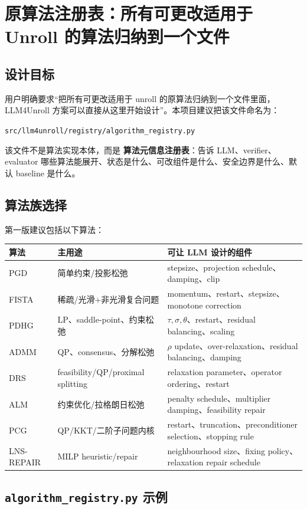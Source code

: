 \documentclass[12pt,a4paper]{ctexart}
\begin{document}
\section{原算法注册表：所有可更改适用于 Unroll 的算法归纳到一个文件}

\subsection{设计目标}
用户明确要求“把所有可更改适用于 unroll 的原算法归纳到一个文件里面，LLM4Unroll 方案可以直接从这里开始设计”。本项目建议把该文件命名为：
\begin{center}
\texttt{src/llm4unroll/registry/algorithm\_registry.py}
\end{center}

该文件不是算法实现本体，而是 \textbf{算法元信息注册表}：告诉 LLM、verifier、evaluator 哪些算法能展开、状态是什么、可改组件是什么、安全边界是什么、默认 baseline 是什么。

\subsection{算法族选择}
第一版建议包括以下算法：
\begin{longtable}{p{}p{}p{}}
\toprule
算法 & 主用途 & 可让 LLM 设计的组件 \\
\midrule
PGD & 简单约束/投影松弛 & stepsize、projection schedule、damping、clip \\
FISTA & 稀疏/光滑+非光滑复合问题 & momentum、restart、stepsize、monotone correction \\
PDHG & LP、saddle-point、约束松弛 & $\tau,\sigma,\theta$、restart、residual balancing、scaling \\
ADMM & QP、consensus、分解松弛 & $\rho$ update、over-relaxation、residual balancing、damping \\
DRS & feasibility/QP/proximal splitting & relaxation parameter、operator ordering、restart \\
ALM & 约束优化/拉格朗日松弛 & penalty schedule、multiplier damping、feasibility repair \\
PCG & QP/KKT/二阶子问题内核 & restart、truncation、preconditioner selection、stopping rule \\
LNS-REPAIR & MILP heuristic/repair & neighbourhood size、fixing policy、relaxation repair schedule \\
\bottomrule
\end{longtable}

\subsection{\texttt{algorithm\_registry.py} 示例}
\end{document}
